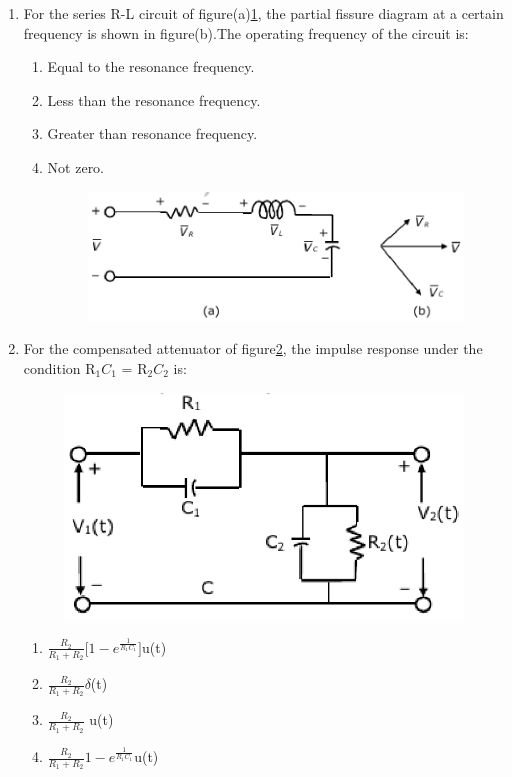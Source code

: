 \documentclass[journal,12pt,twocolumn]{IEEEtran}
\begin{document}
\begin{enumerate}
\item For the series R-L circuit of figure(a)\ref{fig2}, the partial fissure diagram at a certain
frequency is shown in figure(b).The operating frequency of the circuit is:
\begin{enumerate}
\setlength\itemsep{1em}
\item Equal to the resonance frequency.
\item Less than the resonance frequency.
\item Greater than resonance frequency.
\item Not zero.
\begin{figure}[!h]
\begin{center}
\includegraphics[scale=0.5]{./figs/fig2.eps}
\caption{}
\label{fig2}
\end{center}
\end{figure}
\end{enumerate}


\item For the compensated attenuator of figure\ref{fig3}, the impulse response under the
condition R$_{1}C_{1}$ = R$_{2}C_{2}$  is:
\begin{figure}[!h]
\begin{center}

\includegraphics[scale=0.5]{./figs/fig3.eps}
\caption{}
\label{fig3}
\end{center}
\end{figure}
\begin{enumerate}
\setlength\itemsep{2em}
\item $\frac{R_2}{{R_1}+R_2}\big[{1-{e^{\frac{1}{R_1C_1}}}}\big]$u(t)
\item $\frac{R_2}{{R_1}+R_2}\delta$(t)
\item $\frac{R_2}{{R_1}+R_2}$ u(t)
\item $\frac{R_2}{{R_1}+R_2}{1-{e^{\frac{1}{R_1C_1}}}}$u(t)
\end{enumerate}


\end{enumerate}
\end{document}
